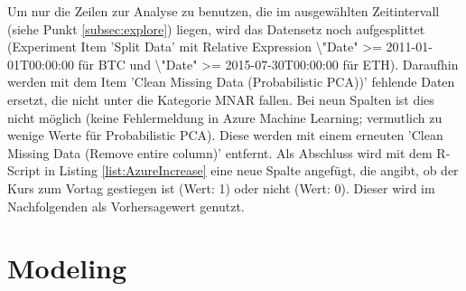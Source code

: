 Um nur die Zeilen zur Analyse zu benutzen, die im ausgewählten Zeitintervall (siehe Punkt \ref{subsec:explore}) liegen, wird das Datensetz noch aufgesplittet (Experiment Item 'Split Data' mit Relative Expression \textbackslash "Date" >= 2011-01-01T00:00:00 für BTC und \textbackslash "Date" >= 2015-07-30T00:00:00 für ETH). Daraufhin werden mit dem Item 'Clean Missing Data (Probabilistic PCA))' fehlende Daten ersetzt, die nicht unter die Kategorie MNAR fallen. Bei neun Spalten ist dies nicht möglich (keine Fehlermeldung in Azure Machine Learning; vermutlich zu wenige Werte für Probabilistic PCA). Diese werden mit einem erneuten 'Clean Missing Data (Remove entire column)' entfernt. Als Abschluss wird mit dem R-Script in Listing \ref{list:AzureIncrease} eine neue Spalte angefügt, die angibt, ob der Kurs zum Vortag gestiegen ist (Wert: 1) oder nicht (Wert: 0). Dieser wird im Nachfolgenden als Vorhersagewert genutzt.



\section{Modeling}
